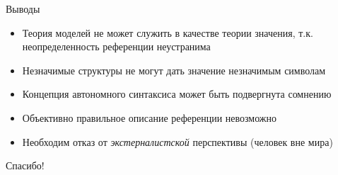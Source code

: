 \documentclass{beamer}
\begin{document}
\begin{frame}{Выводы}
\begin{itemize}
    \item Теория моделей не может служить в качестве теории значения, т.к. неопределенность референции неустранима
    \item Незначимые структуры не могут дать значение незначимым символам
    \item Концепция автономного синтаксиса может быть подвергнута сомнению
    \item Объективно правильное описание референции невозможно
    \item Необходим отказ от \textit{экстерналистской} перспективы (человек вне мира)
\end{itemize}
\end{frame}


\begin{frame}{}
    \thispagestyle{empty}
    \begin{center}
        {\large Спасибо!}
    \end{center}
\end{frame}


\end{document}
